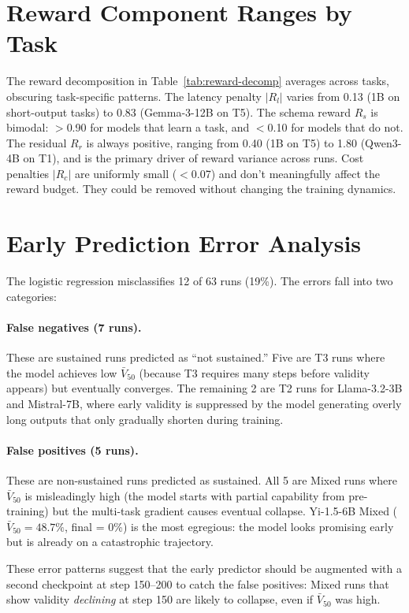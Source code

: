 \documentclass[11pt]{article}
\begin{document}
\section{Reward Component Ranges by Task}
\label{app:reward-tasks}

The reward decomposition in Table~\ref{tab:reward-decomp} averages across tasks, obscuring task-specific patterns.  The latency penalty $|R_l|$ varies from 0.13 (1B on short-output tasks) to 0.83 (Gemma-3-12B on T5).  The schema reward $R_s$ is bimodal: $>$0.90 for models that learn a task, and $<$0.10 for models that do not.  The residual $R_r$ is always positive, ranging from 0.40 (1B on T5) to 1.80 (Qwen3-4B on T1), and is the primary driver of reward variance across runs.  Cost penalties $|R_c|$ are uniformly small ($<$0.07) and don't meaningfully affect the reward budget.  They could be removed without changing the training dynamics.

\section{Early Prediction Error Analysis}
\label{app:early-errors}

The logistic regression misclassifies 12 of 63 runs (19\%).  The errors fall into two categories:

\paragraph{False negatives (7 runs).} These are sustained runs predicted as ``not sustained.'' Five are T3 runs where the model achieves low $\bar{V}_{50}$ (because T3 requires many steps before validity appears) but eventually converges.  The remaining 2 are T2 runs for Llama-3.2-3B and Mistral-7B, where early validity is suppressed by the model generating overly long outputs that only gradually shorten during training.

\paragraph{False positives (5 runs).} These are non-sustained runs predicted as sustained.  All 5 are Mixed runs where $\bar{V}_{50}$ is misleadingly high (the model starts with partial capability from pre-training) but the multi-task gradient causes eventual collapse.  Yi-1.5-6B Mixed ($\bar{V}_{50} = 48.7\%$, final = 0\%) is the most egregious: the model looks promising early but is already on a catastrophic trajectory.

These error patterns suggest that the early predictor should be augmented with a second checkpoint at step 150--200 to catch the false positives: Mixed runs that show validity \emph{declining} at step 150 are likely to collapse, even if $\bar{V}_{50}$ was high.
\end{document}
